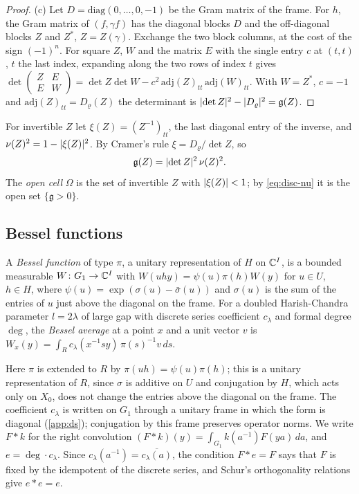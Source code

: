 \begin{proof}
(c) Let $D=\mathrm{diag}(0,\dots,0,-1)$ be the Gram matrix of the frame. For $h$, the Gram matrix of $(f,\gamma f)$ has the diagonal blocks $D$ and the off-diagonal blocks $Z$ and $Z^*$, $Z=Z(\gamma)$. Exchange the two block columns,
at the cost of the sign $(-1)^n$. For square $Z$, $W$ and the matrix $E$ with the single entry $c$ at $(t,t)$, $t$ the last index, expanding along the two rows of index $t$ gives
$\det\begin{pmatrix}Z&E\\E&W\end{pmatrix}=\det Z\det W-c^2\,\mathrm{adj}(Z)_{tt}\,\mathrm{adj}(W)_{tt}$. With $W=Z^*$, $c=-1$ and $\mathrm{adj}(Z)_{tt}=D_\varrho(Z)$ the determinant is $\lvert \det Z\rvert^2-\lvert D_\varrho\rvert^2=\mathfrak g(Z)$.
\end{proof}

For invertible $Z$ let $\xi(Z)=(Z^{-1})_{tt}$, the last diagonal entry of the inverse, and $\nu(Z)^2=1-\lvert \xi(Z)\rvert^2$. By Cramer's rule $\xi=D_\varrho/\det Z$, so
\begin{equation}\label{eq:disc-nu}
  \mathfrak g(Z)=\lvert \det Z\rvert^2\,\nu(Z)^2 .
\end{equation}
The \emph{open cell} $\Omega$ is the set of invertible $Z$ with $\lvert \xi(Z)\rvert<1$; by \eqref{eq:disc-nu} it is the open set $\{\mathfrak g>0\}$.

\subsection{Bessel functions}\label{ss:bessel-functions}
A \emph{Bessel function} of type $\pi$, a unitary representation of $H$ on $\mathbb{C}^I$, is a bounded measurable $W\colon G_1\to\mathbb{C}^I$ with $W(uhy)=\psi(u)\pi(h)W(y)$ for $u\in U$,
$h\in H$, where $\psi(u)=\exp(\sigma(u)-\bar\sigma(u))$ and $\sigma(u)$ is the sum of the entries of $u$ just above the diagonal on the frame. For a doubled
Harish-Chandra parameter $l=2\lambda$ of large gap with discrete series coefficient $c_\lambda$ and formal degree $\deg$, the \emph{Bessel average} at a point $x$ and a
unit vector $v$ is $W_x(y)=\int_Rc_\lambda(x^{-1}sy)\,\pi(s)^{-1}v\,ds$.

Here $\pi$ is extended to $R$ by $\pi(uh)=\psi(u)\pi(h)$; this is a unitary representation of $R$, since $\sigma$ is additive on $U$ and conjugation by $H$, which acts only on $X_0$, does not change the entries
above the diagonal on the frame. The coefficient $c_\lambda$ is written on $G_1$ through a unitary frame in which the form is diagonal (\cref{app:ds}); conjugation by this frame preserves operator norms. We write
$F*k$ for the right convolution $(F*k)(y)=\int_{G_1}k(a^{-1})F(ya)\,da$, and $e=\deg\cdot c_\lambda$. Since $c_\lambda(a^{-1})=\overline{c_\lambda(a)}$, the condition $F*e=F$ says that $F$ is fixed by the idempotent of the discrete
series, and Schur's orthogonality relations give $e*e=e$.

